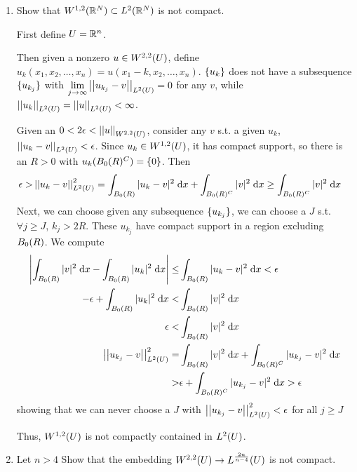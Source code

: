 \begin{enumerate}
\item Show that $W^{1, 2}(\reals^N) \subset L^2(\reals^N)$ is not compact.

  First define $\domain = \reals^n$.

  Then given a nonzero $u \in W^{2, 2}(\domain)$, define $u_k(x_1, x_2, \ldots, x_n) = u(x_1 - k, x_2, \ldots, x_n)$.
  $\set{u_k}$ does not have a subsequence $\set{u_{k_j}}$ with
  $\limitto{j}{\infty} \lnorm{u_{k_j} - v}{2}{\domain} = 0$ for any $v$,
  while $\lnorm{u_k}{2}{\domain} = \lnorm{u}{2}{\domain} < \infty$.

  Given an $0 < 2 \epsilon < \wnorm{u}{2}{2}{\domain}$,
  consider any $v$ s.t. a given $u_k$, $\lnorm{u_k - v}{2}{\domain} < \epsilon$.
  Since $u_k \in W^{1, 2}(\domain)$, it has compact support, so there is an $R > 0$ with $u_k(\ball{R}{0}^C) = \set{0}$.
  Then
  \begin{align*}
    \epsilon > &\lnorm{u_k - v}{2}{\domain}^2 = \int_{\ball{R}{0}} |u_k - v|^2 \dx + \int_{\ball{R}{0}^C} |v|^2 \dx
          \geq \int_{\ball{R}{0}^C} |v|^2 \dx
  \end{align*}
  Next, we can choose given any subsequence $\set{u_{k_j}}$,
  we can choose a $J$ s.t. $\forall j \geq J$, $k_j > 2 R$.
  These $u_{k_j}$ have compact support in a region excluding $\ball{R}{0}$.
  We compute
  \begin{align*}
    \left| \int_{\ball{R}{0}} |v|^2 \dx - \int_{\ball{R}{0}} |u_k|^2 \dx \right|
      \leq &\int_{\ball{R}{0}} |u_k - v|^2 \dx < \epsilon\\
    -\epsilon + \int_{\ball{R}{0}} |u_k|^2 \dx < &\int_{\ball{R}{0}} |v|^2 \dx\\
    \epsilon < &\int_{\ball{R}{0}} |v|^2 \dx\\
    \lnorm{u_{k_j} - v}{2}{\domain}^2 = &\int_{\ball{R}{0}} |v|^2 \dx + \int_{\ball{R}{0}^C} |u_{k_j} - v|^2 \dx\\
      > &\epsilon + \int_{\ball{R}{0}^C} |u_{k_j} - v|^2 \dx > \epsilon
  \end{align*}
  showing that we can never choose a $J$ with $\lnorm{u_{k_j} - v}{2}{\domain}^2 < \epsilon$ for all $j \geq J$

  Thus, $W^{1, 2}(\domain)$ is not compactly contained in $L^2(\domain)$.

\item Let $n > 4$
  Show that the embedding $W^{2, 2}(\domain) \rightarrow L^{\frac{2 n}{n - 4}}(\domain)$ is not compact.


\end{enumerate}

